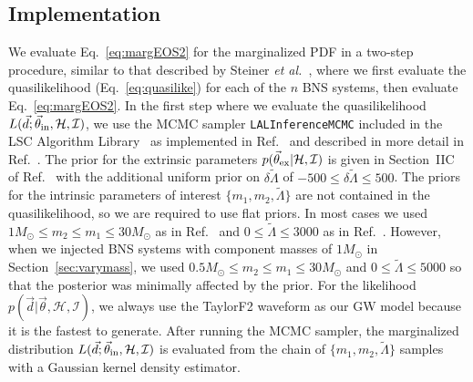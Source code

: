 \documentclass[twocolumn,prd,amssymb,aps,nofootinbib,showpacs,epsf]{revtex4}
\begin{document}
\subsection{Implementation}

We evaluate Eq.~\eqref{eq:margEOS2} for the marginalized PDF in a two-step procedure, similar to that described by Steiner {\it et al.}~\cite{SteinerLattimerBrown2010}, where we first evaluate the quasilikelihood (Eq.~\eqref{eq:quasilike}) for each of the $n$ BNS systems, then evaluate Eq.~\eqref{eq:margEOS2}. In the first step where we evaluate the quasilikelihood $L(\vec d; \vec\theta_{\rm in}, \mathcal{H}, \mathcal{I})$, we use the MCMC sampler \texttt{LALInferenceMCMC} included in the LSC Algorithm Library~\cite{lal} as implemented in Ref.~\cite{WadeCreightonOchsner2014} and described in more detail in Ref.~\cite{VeitchRaymondFarr2014}. The prior for the extrinsic parameters $p(\vec\theta_{\rm ex} | \mathcal{H}, \mathcal{I})$ is given in Section~IIC of Ref.~\cite{VeitchRaymondFarr2014} with the additional uniform prior on $\delta\tilde\Lambda$ of $-500 \le \delta\tilde\Lambda \le 500$. The priors for the intrinsic parameters of interest $\{m_{1}, m_{2}, \tilde\Lambda\}$ are not contained in the quasilikelihood, so we are required to use flat priors. In most cases we used $1M_\odot \le m_2 \le m_1 \le 30M_\odot$ as in Ref.~\cite{VeitchRaymondFarr2014} and $0 \le \tilde\Lambda \le 3000$ as in Ref.~\cite{WadeCreightonOchsner2014}. However, when we injected BNS systems with component masses of $1M_\odot$ in Section~\ref{sec:varymass}, we used $0.5M_\odot \le m_2 \le m_1 \le 30M_\odot$ and $0 \le \tilde\Lambda \le 5000$ so that the posterior was minimally affected by the prior. For the likelihood $p(\vec d | \vec\theta, \mathcal{H}, \mathcal{I})$, we always use the TaylorF2 waveform as our GW model because it is the fastest to generate. After running the MCMC sampler, the marginalized distribution $L(\vec d; \vec\theta_{\rm in}, \mathcal{H}, \mathcal{I})$ is evaluated from the chain of $\{m_{1}, m_{2}, \tilde\Lambda\}$ samples with a Gaussian kernel density estimator.
\end{document}
